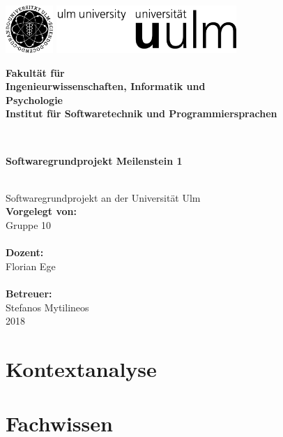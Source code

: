 \documentclass[a4paper,12pt,
headsepline,           %
oneside,               %
pointlessnumbers,      %
bibtotoc,              %
]{scrartcl}
\newcommand{\fullname}{Gruppe 10}
\newcommand{\titel}{Softwaregrundprojekt Meilenstein 1}
\newcommand{\jahr}{2018}
\newcommand{\dozent}{Florian Ege}
\newcommand{\betreuer}{Stefanos Mytilineos}
\newcommand{\fakultaet}{Ingenieurwissenschaften, Informatik und\\Psychologie}
\newcommand{\institut}{Institut für Softwaretechnik und Programmiersprachen}
\begin{document}
    \thispagestyle{empty}
    \begin{addmargin*}[4mm]{-10mm}

        \includegraphics[height=1.8cm]{images/unilogo_bild}
        \hfill
        \includegraphics[height=1.8cm]{images/unilogo_wort}\\[1em]

        {\footnotesize
        \hspace*{115mm}\parbox[t]{35mm}{\bfseries Fakultät für\\
        \fakultaet\\
        \mdseries \institut}\\[2cm]

        \parbox{140mm}{\bfseries \LARGE \titel}\\[2.5em]
        {\footnotesize Softwaregrundprojekt an der Universität Ulm}\\[3em]

        {\footnotesize \bfseries Vorgelegt von:}\\
        {\footnotesize \fullname\\}\\ [1em]
        {\footnotesize \bfseries Dozent:}\\
        {\footnotesize \dozent\\}\\[1em]
        {\footnotesize \bfseries Betreuer:}\\
        {\footnotesize \betreuer}\\ [1em]
        {\footnotesize \jahr}
        }
    \end{addmargin*}
    \pagebreak
    \tableofcontents
    \pagebreak

    \section{Kontextanalyse}
    
    \section{Fachwissen}
    
    
\end{document}

